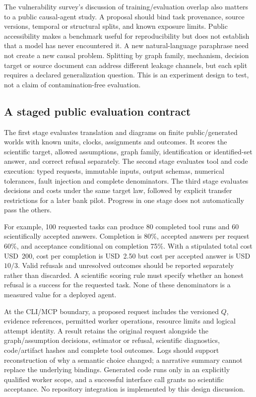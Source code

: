 The vulnerability survey's discussion of training/evaluation overlap also matters to a public causal-agent study. A proposal should bind task provenance, source versions, temporal or structural splits, and known exposure limits. Public accessibility makes a benchmark useful for reproducibility but does not establish that a model has never encountered it. A new natural-language paraphrase need not create a new causal problem. Splitting by graph family, mechanism, decision target or source document can address different leakage channels, but each split requires a declared generalization question. This is an experiment design to test, not a claim of contamination-free evaluation.~\citep{exec25_cow_vulnerability,exec25_cow_reference}

\subsection{A staged public evaluation contract}

The first stage evaluates translation and diagrams on finite public/generated worlds with known units, clocks, assignments and outcomes. It scores the scientific target, allowed assumptions, graph family, identification or identified-set answer, and correct refusal separately. The second stage evaluates tool and code execution: typed requests, immutable inputs, output schemas, numerical tolerances, fault injection and complete denominators. The third stage evaluates decisions and costs under the same target law, followed by explicit transfer restrictions for a later bank pilot. Progress in one stage does not automatically pass the others.~\citep{exec25_cow_reference}

For example, 100 requested tasks can produce 80 completed tool runs and 60 scientifically accepted answers. Completion is 80\%, accepted answers per request 60\%, and acceptance conditional on completion 75\%. With a stipulated total cost USD~200, cost per completion is USD~2.50 but cost per accepted answer is USD~$10/3$. Valid refusals and unresolved outcomes should be reported separately rather than discarded. A scientific scoring rule must specify whether an honest refusal is a success for the requested task. None of these denominators is a measured value for a deployed agent.~\citep{exec25_cow_reference}

At the CLI/MCP boundary, a proposed request includes the versioned $Q$, evidence references, permitted worker operations, resource limits and logical attempt identity. A result retains the original request alongside the graph/assumption decisions, estimator or refusal, scientific diagnostics, code/artifact hashes and complete tool outcomes. Logs should support reconstruction of why a semantic choice changed; a narrative summary cannot replace the underlying bindings. Generated code runs only in an explicitly qualified worker scope, and a successful interface call grants no scientific acceptance. No repository integration is implemented by this design discussion.~\citep{exec25_cow_reference}

